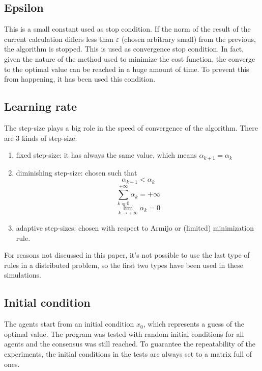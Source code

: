 \documentclass[a4paper,11pt,oneside]{book}
\begin{document}
\subsection{Epsilon} \label{Subsec2.2.2}
This is a small constant used as stop condition. If the norm of the result of the current calculation differs less than $\varepsilon$ (chosen arbitrary small) from the previous, the algorithm is stopped. This is used as convergence stop condition. In fact, given the nature of the method used to minimize the cost function, the converge to the optimal value can be reached in a huge amount of time. To prevent this from happening, it has been used this condition.

\subsection{Learning rate} \label{Subsec2.2.3}
The step-size plays a big role in the speed of convergence of the algorithm. There are 3 kinds of step-size:
\begin{enumerate}
	\item fixed step-size: it has always the same value, which means $\alpha_{k+1} = \alpha_k$
	\item diminishing step-size: chosen such that 
	\begin{equation}
	\alpha_{k+1} < \alpha_k
	\end{equation}
	\begin{equation}
	\sum_{k=0}^{+\infty} \alpha_k = +\infty
	\end{equation}
	\begin{equation}
	\lim\limits_{k \to +\infty} \alpha_k = 0
	\end{equation}
	\item adaptive step-sizes: chosen with respect to Armijo or (limited) minimization rule.
\end{enumerate}
For reasons not discussed in this paper, it's not possible to use the last type of rules in a distributed problem, so the first two types have been used in these simulations.

\subsection{Initial condition} \label{Subsec2.2.4}
The agents start from an initial condition $x_0$, which represents a guess of the optimal value. The program was tested with random initial conditions for all agents and the consensus was still reached. To guarantee the repeatability of the experiments, the initial conditions in the tests are always set to a matrix full of ones.
\end{document}
